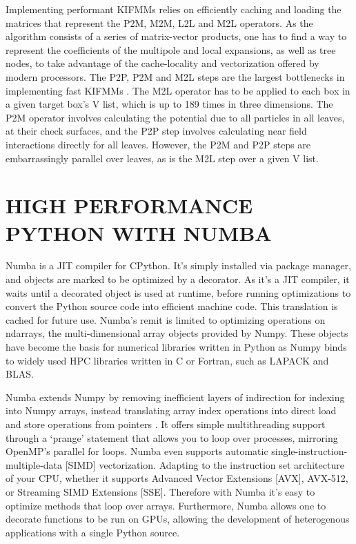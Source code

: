 \documentclass{IEEEcsmag}
\begin{document}
Implementing performant KIFMMs relies on efficiently caching and loading the matrices that represent the P2M, M2M, L2L and M2L operators. As the algorithm consists of a series of matrix-vector products, one has to find a way to represent the coefficients of the multipole and local expansions, as well as tree nodes, to take advantage of the cache-locality and vectorization offered by modern processors. The P2P, P2M and M2L steps are the largest bottlenecks in implementing fast KIFMMs \cite{Lashuk2012}. The M2L operator has to be applied to each box in a given target box's V list, which is up to 189 times in three dimensions. The P2M operator involves calculating the potential due to all particles in all leaves, at their check surfaces, and the P2P step involves calculating near field interactions directly for all leaves. However, the P2M and P2P steps are embarrassingly parallel over leaves, as is the M2L step over a given V list.

\section{HIGH PERFORMANCE PYTHON WITH NUMBA}

Numba is a JIT compiler for CPython. It's simply installed via package manager, and objects are marked to be optimized by a decorator. As it's a JIT compiler, it waits until a decorated object is used at runtime, before running optimizations to convert the Python source code into efficient machine code. This translation is cached for future use. Numba's remit is limited to optimizing operations on ndarrays, the multi-dimensional array objects provided by Numpy. These objects have become the basis for numerical libraries written in Python as Numpy binds to widely used HPC libraries written in C or Fortran, such as LAPACK and BLAS.

Numba extends Numpy by removing inefficient layers of indirection for indexing into Numpy arrays, instead translating array index operations into direct load and store operations from pointers \cite{Lam2015}. It offers simple multithreading support through a `prange' statement that allows you to loop over processes, mirroring OpenMP's parallel for loops. Numba even supports automatic single-instruction-multiple-data [SIMD] vectorization. Adapting to the instruction set architecture of your CPU, whether it supports Advanced Vector Extensions [AVX], AVX-512, or  Streaming SIMD Extensions [SSE]. Therefore with Numba it's easy to optimize methods that loop over arrays. Furthermore, Numba allows one to decorate functions to be run on GPUs, allowing the development of heterogenous applications with a single Python source.
\end{document}
